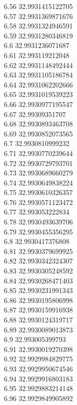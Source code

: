 {6.56	32.9931415122705\\
6.57	32.9931369871676\\
6.58	32.9931324946591\\
6.59	32.9931280346819\\
6.6	32.9931236071687\\
6.61	32.993119212048\\
6.62	32.9931148492444\\
6.63	32.9931105186784\\
6.64	32.9931062202666\\
6.65	32.9931019539223\\
6.66	32.9930977195547\\
6.67	32.99309351707\\
6.68	32.9930893463708\\
6.69	32.9930852073565\\
6.7	32.9930810999232\\
6.71	32.9930770239644\\
6.72	32.9930729793701\\
6.73	32.9930689660279\\
6.74	32.9930649838224\\
6.75	32.9930610326357\\
6.76	32.9930571123472\\
6.77	32.993053222834\\
6.78	32.9930493639706\\
6.79	32.9930455356295\\
6.8	32.9930417376808\\
6.81	32.9930379699925\\
6.82	32.9930342324307\\
6.83	32.9930305248592\\
6.84	32.9930268471403\\
6.85	32.9930231991343\\
6.86	32.9930195806998\\
6.87	32.9930159916938\\
6.88	32.9930124319717\\
6.89	32.9930089013873\\
6.9	32.993005399793\\
6.91	32.9930019270398\\
6.92	32.9929984829775\\
6.93	32.9929950674546\\
6.94	32.9929916803183\\
6.95	32.9929883214148\\
6.96	32.9929849905892\\
}
